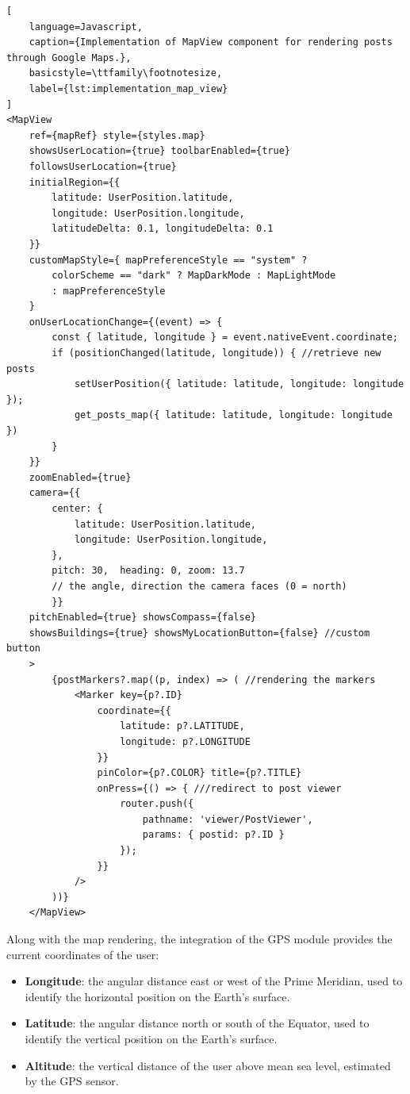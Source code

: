 \begin{lstlisting}[
    language=Javascript,
    caption={Implementation of MapView component for rendering posts through Google Maps.},
    basicstyle=\ttfamily\footnotesize,
    label={lst:implementation_map_view}
]
<MapView 
    ref={mapRef} style={styles.map}
    showsUserLocation={true} toolbarEnabled={true}
    followsUserLocation={true}
    initialRegion={{
        latitude: UserPosition.latitude,
        longitude: UserPosition.longitude,
        latitudeDelta: 0.1, longitudeDelta: 0.1
    }}
    customMapStyle={ mapPreferenceStyle == "system" ? 
        colorScheme == "dark" ? MapDarkMode : MapLightMode
        : mapPreferenceStyle
    }
    onUserLocationChange={(event) => {
        const { latitude, longitude } = event.nativeEvent.coordinate;
        if (positionChanged(latitude, longitude)) { //retrieve new posts
            setUserPosition({ latitude: latitude, longitude: longitude });
            get_posts_map({ latitude: latitude, longitude: longitude }) 
        }
    }}
    zoomEnabled={true}
    camera={{
        center: {
            latitude: UserPosition.latitude,
            longitude: UserPosition.longitude,
        },
        pitch: 30,  heading: 0, zoom: 13.7
        // the angle, direction the camera faces (0 = north)
        }}
    pitchEnabled={true} showsCompass={false}
    showsBuildings={true} showsMyLocationButton={false} //custom button
    >
        {postMarkers?.map((p, index) => ( //rendering the markers
            <Marker key={p?.ID}
                coordinate={{
                    latitude: p?.LATITUDE, 
                    longitude: p?.LONGITUDE 
                }}
                pinColor={p?.COLOR} title={p?.TITLE}
                onPress={() => { ///redirect to post viewer
                    router.push({
                        pathname: 'viewer/PostViewer',
                        params: { postid: p?.ID }
                    });
                }}
            />
        ))}
    </MapView>
\end{lstlisting}


Along with the map rendering, the integration of the GPS module provides the current coordinates of the user:
\begin{itemize}
    \item \textbf{Longitude}: the angular distance east or west of the Prime Meridian, used to identify the horizontal position on the Earth's surface.
    \item \textbf{Latitude}: the angular distance north or south of the Equator, used to identify the vertical position on the Earth's surface.
    \item \textbf{Altitude}: the vertical distance of the user above mean sea level, estimated by the GPS sensor.
\end{itemize}

